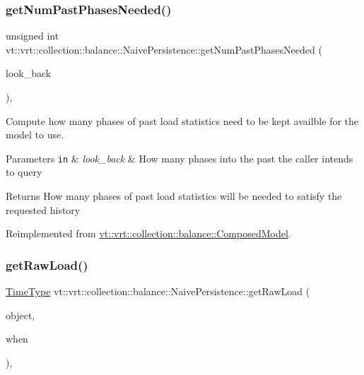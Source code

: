 \subsubsection{\texorpdfstring{get\+Num\+Past\+Phases\+Needed()}{getNumPastPhasesNeeded()}}
{\footnotesize\ttfamily unsigned int vt\+::vrt\+::collection\+::balance\+::\+Naive\+Persistence\+::get\+Num\+Past\+Phases\+Needed (\begin{DoxyParamCaption}\item[{unsigned int}]{look\+\_\+back }\end{DoxyParamCaption})\hspace{0.3cm}{\ttfamily [override]}, {\ttfamily [virtual]}}



Compute how many phases of past load statistics need to be kept availble for the model to use. 


\begin{DoxyParams}[1]{Parameters}
\mbox{\tt in}  & {\em look\+\_\+back} & How many phases into the past the caller intends to query\\
\hline
\end{DoxyParams}
\begin{DoxyReturn}{Returns}
How many phases of past load statistics will be needed to satisfy the requested history 
\end{DoxyReturn}


Reimplemented from \hyperlink{classvt_1_1vrt_1_1collection_1_1balance_1_1_composed_model_abf2a02ff624e66c7076bfe3dce961981}{vt\+::vrt\+::collection\+::balance\+::\+Composed\+Model}.

\mbox{\label{structvt_1_1vrt_1_1collection_1_1balance_1_1_naive_persistence_a6bf2e0584a70493e1bfa0251d7e9b755}} 
\subsubsection{\texorpdfstring{get\+Raw\+Load()}{getRawLoad()}}
{\footnotesize\ttfamily \hyperlink{namespacevt_a876a9d0cd5a952859c72de8a46881442}{Time\+Type} vt\+::vrt\+::collection\+::balance\+::\+Naive\+Persistence\+::get\+Raw\+Load (\begin{DoxyParamCaption}\item[{\hyperlink{namespacevt_1_1vrt_1_1collection_1_1balance_a9f5b53fafb270212279a4757d2c4cd28}{Element\+I\+D\+Struct}}]{object,  }\item[{\hyperlink{structvt_1_1vrt_1_1collection_1_1balance_1_1_phase_offset}{Phase\+Offset}}]{when }\end{DoxyParamCaption})\hspace{0.3cm}{\ttfamily [override]}, {\ttfamily [virtual]}}




